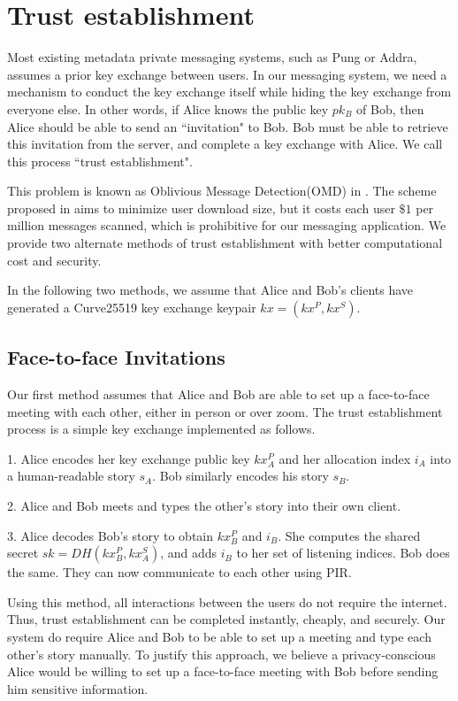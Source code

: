 \section{Trust establishment}

Most existing metadata private messaging systems, such as Pung or Addra, assumes a prior key exchange between users. In our messaging system, we need a mechanism to conduct the key exchange itself while hiding the key exchange from everyone else. In other words, if Alice knows the public key $pk_B$ of Bob, then Alice should be able to send an ``invitation" to Bob. Bob must be able to retrieve this invitation from the server, and complete a key exchange with Alice. We call this process ``trust establishment".

This problem is known as Oblivious Message Detection(OMD) in \cite{liutromer2021}. The scheme proposed in \cite{liutromer2021} aims to minimize user download size, but it costs each user $\$ 1$ per million messages scanned, which is prohibitive for our messaging application. We provide two alternate methods of trust establishment with better computational cost and security.

In the following two methods, we assume that Alice and Bob's clients have generated a Curve25519 key exchange keypair $kx = (kx^P, kx^S)$.

\subsection{Face-to-face Invitations}
Our first method assumes that Alice and Bob are able to set up a face-to-face meeting with each other, either in person or over zoom. The trust establishment process is a simple key exchange implemented as follows.

1. Alice encodes her key exchange public key $kx_A^P$ and her allocation index $i_A$ into a human-readable story $s_A$. Bob similarly encodes his story $s_B$.

2. Alice and Bob meets and types the other's story into their own client. 

3. Alice decodes Bob's story to obtain $kx^P_B$ and $i_B$. She computes the shared secret $sk = DH(kx^P_B, kx^S_A)$, and adds $i_B$ to her set of listening indices. Bob does the same. They can now communicate to each other using PIR.

Using this method, all interactions between the users do not require the internet. Thus, trust establishment can be completed instantly, cheaply, and securely. Our system do require Alice and Bob to be able to set up a meeting and type each other's story manually. To justify this approach, we believe a privacy-conscious Alice would be willing to set up a face-to-face meeting with Bob before sending him sensitive information.

